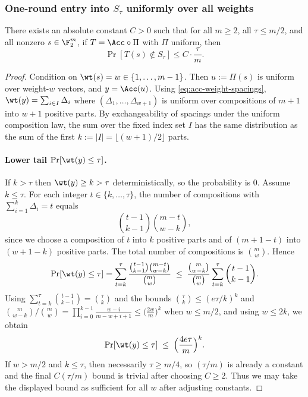 \subsubsection{One-round entry into \(S_\tau\) uniformly over all weights}
\label{sec:entry-lemma}

\begin{lemma}
\label{lem:enter-wide-zone}
There exists an absolute constant \(C>0\) such that for all \(m\ge 2\), all \(\tau\le m/2\), and all nonzero \(s\in\F_2^m\),
if \(T=\Acc\circ \Pi\) with \(\Pi\) uniform, then
\[
\Pr[T(s)\notin S_\tau]\le C\cdot \frac{\tau}{m}.
\]
\end{lemma}

\begin{proof}
Condition on \(\wt(s)=w\in\{1,\dots,m-1\}\). Then \(u:=\Pi(s)\) is uniform over weight-\(w\) vectors, and \(y=\Acc(u)\).
Using \eqref{eq:acc-weight-spacings}, \(\wt(y)=\sum_{i\in I}\Delta_i\) where \((\Delta_1,\dots,\Delta_{w+1})\) is uniform over
compositions of \(m+1\) into \(w+1\) positive parts. By exchangeability of spacings under the uniform composition law, the sum over the
fixed index set \(I\) has the same distribution as the sum of the first \(k:=|I|=\lfloor(w+1)/2\rfloor\) parts.

\paragraph{Lower tail \(\Pr[\wt(y)\le \tau]\).}
If \(k>\tau\) then \(\wt(y)\ge k>\tau\) deterministically, so the probability is \(0\).
Assume \(k\le \tau\). For each integer \(t\in\{k,\dots,\tau\}\), the number of compositions with
\(\sum_{i=1}^k \Delta_i=t\) equals
\[
\binom{t-1}{k-1}\binom{m-t}{w-k},
\]
since we choose a composition of \(t\) into \(k\) positive parts and of \((m+1-t)\) into \((w+1-k)\) positive parts.
The total number of compositions is \(\binom{m}{w}\). Hence
\[
\Pr[\wt(y)\le \tau]
=
\sum_{t=k}^{\tau}\frac{\binom{t-1}{k-1}\binom{m-t}{w-k}}{\binom{m}{w}}
\;\le\;
\frac{\binom{m}{w-k}}{\binom{m}{w}}
\sum_{t=k}^{\tau}\binom{t-1}{k-1}.
\]
Using \(\sum_{t=k}^{\tau}\binom{t-1}{k-1}=\binom{\tau}{k}\) and the bounds
\(\binom{\tau}{k}\le (e\tau/k)^k\) and
\(\binom{m}{w-k}/\binom{m}{w}
=\prod_{i=0}^{k-1}\frac{w-i}{m-w+i+1}
\le \bigl(\frac{2w}{m}\bigr)^k\)
when \(w\le m/2\), and using \(w\le 2k\), we obtain
\[
\Pr[\wt(y)\le \tau]
\;\le\;
\Bigl(\frac{4e\tau}{m}\Bigr)^k.
\]
If \(w>m/2\) and \(k\le \tau\), then necessarily \(\tau\ge m/4\), so \((\tau/m)\) is already a constant and the final
\(C(\tau/m)\) bound is trivial after choosing \(C\ge 2\). Thus we may take the displayed bound as sufficient for all \(w\)
after adjusting constants.


\end{proof}
